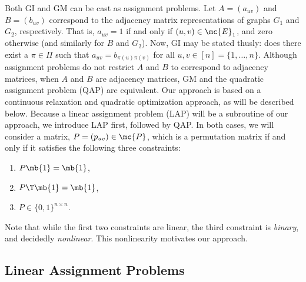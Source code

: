 \documentclass[10pt,journal,cspaper,compsoc]{IEEEtran}
\begin{document}
Both GI and GM can be cast as assignment problems.  Let $A=(a_{uv})$ and $B=(b_{uv})$ correspond to the adjacency matrix representations of graphs $G_1$ and $G_2$, respectively.  That is, $a_{uv}=1$ if and only if $(u,v) \in \mc{E}_1$, and zero otherwise (and similarly for $B$ and $G_2$). Now, GI may be stated thusly:  does there exist a $\pi \in \Pi$ such that $a_{uv}=b_{\pi(u)\pi(v)}$ for all $u,v \in [n]=\{1,\ldots, n\}$.  Although assignment problems do not restrict $A$ and $B$ to correspond to adjacency matrices, when $A$ and $B$ are adjacency matrices, GM and the quadratic assignment problem (QAP) are equivalent.  Our approach is based on a continuous relaxation and quadratic optimization approach, as will be described below.  Because a linear assignment problem (LAP) will be a subroutine of our approach, we introduce LAP first, followed by QAP.  In both cases, we will consider a matrix, $P=(p_{uv}) \in \mc{P}$, which is a permutation matrix if and only if it satisfies the following three constraints:
\begin{enumerate}
\item	$P\mb{1} = \mb{1}$,
\item	$P\T \mb{1}=\mb{1}$, %
\item 	$P \in  \{0,1\}^{n \times n}$.	
\end{enumerate}
Note that while the first two constraints are linear, the third constraint is \emph{binary}, and decidedly \emph{nonlinear}.  This nonlinearity motivates our approach.






\subsection{Linear Assignment Problems} %
\label{ssub:linear_assignment_problems}

\end{document}
